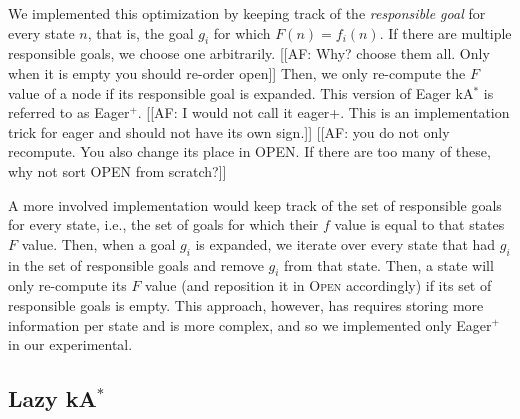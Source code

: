 \documentclass{aicom2e}
\newcommand{\kastar}{kA$^*$}
\newcommand{\open}{\textsc{Open}}
\begin{document}
We implemented this optimization by keeping track of the {\em responsible goal}
for every state $n$, that is, the goal $g_i$ for which $F(n)=f_i(n)$. If there
are multiple responsible goals, we choose one arbitrarily. [[AF: Why? choose
them all. Only when it is empty you should re-order open]] Then, we only
re-compute the $F$ value of a node if its responsible goal is expanded. This
version of Eager \kastar{} is referred to as Eager$^+$. [[AF: I would not call
it eager+. This is an implementation trick for eager and should not have its
own sign.]] [[AF: you do not only recompute. You also change its place in OPEN.
If there are too many of these, why not sort OPEN from scratch?]]

A more involved implementation would keep track of the set of responsible goals
for every state, i.e., the set of goals for which their $f$ value is equal to
that states $F$ value. Then, when a goal $g_i$ is expanded, we iterate over
every state that had $g_i$ in the set of responsible goals and remove $g_i$
from that state. Then, a state will only re-compute its $F$ value (and reposition it in \open{} accordingly) if its set of
responsible goals is empty. This approach, however, has requires storing more
information per state and is more complex, and so we implemented only Eager$^+$
in our experimental. %




\subsection{Lazy \kastar{}}
\end{document}
